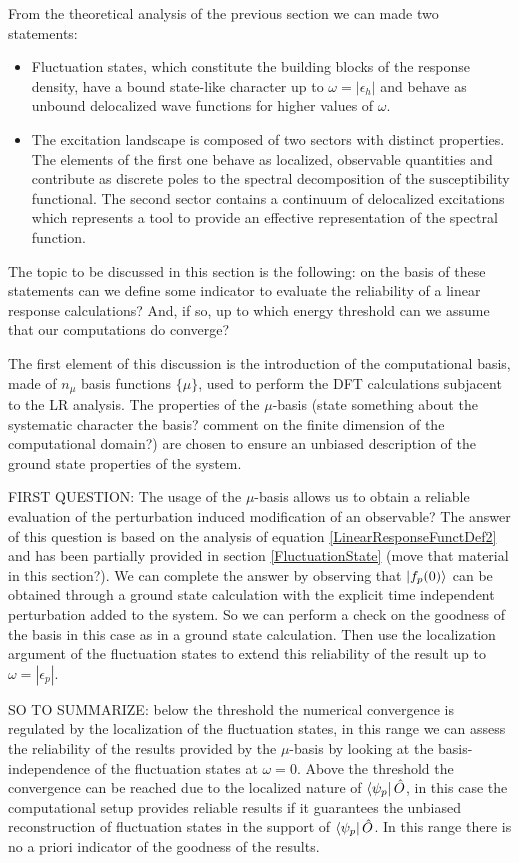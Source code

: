 \documentclass[reprint,aps,prb]{revtex4-1}
\newcommand{\eps}{\epsilon}
\newcommand{\op}[1]{\hat {#1}}
\begin{document}
From the theoretical analysis of the previous section we can made two statements:
\begin{itemize}
 \item Fluctuation states, which constitute the building blocks of the response density, have a bound state-like character up to $\omega=|\eps_h|$ and behave as unbound delocalized
 wave functions for higher values of $\omega$. 
 \item The excitation landscape is composed of two sectors with distinct properties. The elements of the first one behave as localized, observable quantities and contribute as discrete 
 poles to the spectral decomposition of the susceptibility functional. The second sector contains a continuum of delocalized excitations which represents a tool to provide
 an effective representation of the spectral function. 
\end{itemize}
The topic to be discussed in this section is the following: on the basis of these statements can we define some indicator to evaluate the reliability of a linear response calculations? And, 
if so, up to which energy threshold can we assume that our computations do converge?

The first element of this discussion is the introduction of the computational basis, made of $n_\mu$ basis functions $\{\mu\}$, used to perform the DFT calculations subjacent to the LR analysis. 
The properties of the $\mu$-basis (state something about the systematic character the basis? comment on the finite dimension of the computational domain?) are chosen to ensure an unbiased description 
of the ground state properties of the system. 

FIRST QUESTION: The usage of the $\mu$-basis allows us to obtain a reliable evaluation of the perturbation induced modification of an observable? 
The answer of this question is based on the analysis of equation \eqref{LinearResponseFunctDef2} and has been partially provided in section \ref{FluctuationState} (move that material in this section?). 
We can complete the answer by observing that $\ket{f_p(0)}$ can be obtained through a ground state calculation with the explicit time independent perturbation added to the system. So we can perform
a check on the goodness of the basis in this case as in a ground state calculation. Then use the localization argument of the fluctuation states to extend this reliability of the result up to
$\omega=|\eps_p|$. 

SO TO SUMMARIZE: below the threshold the numerical convergence is regulated by the localization of the fluctuation states, in this range we can assess the reliability of the results provided by
the $\mu$-basis by looking at the basis-independence of the fluctuation states at $\omega=0$. Above the threshold the convergence can be reached due to the localized nature of $\bra{\psi_p}\op O$, 
in this case the computational setup provides reliable results if it guarantees the unbiased reconstruction of fluctuation states in the support of $\bra{\psi_p}\op O$. In this range there is no a 
priori indicator of the goodness of the results. 
\end{document}
